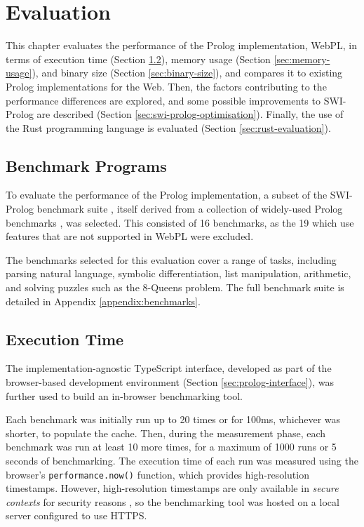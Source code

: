 \chapter{Evaluation}

This chapter evaluates the performance of the Prolog implementation, WebPL, in terms of execution time (Section \ref{sec:execution-time}), memory usage (Section \ref{sec:memory-usage}), and binary size (Section \ref{sec:binary-size}), and compares it to existing Prolog implementations for the Web. Then, the factors contributing to the performance differences are explored, and some possible improvements to SWI-Prolog are described (Section \ref{sec:swi-prolog-optimisation}). Finally, the use of the Rust programming language is evaluated (Section \ref{sec:rust-evaluation}).

\section{Benchmark Programs}

To evaluate the performance of the Prolog implementation, a subset of the SWI-Prolog benchmark suite \cite{wielemakerSWIPrologbenchmarksuite2010}, itself derived from a collection of widely-used Prolog benchmarks \cite{haygoodPrologBenchmarkSuite1989}, was selected. This consisted of 16 benchmarks, as the 19 which use features that are not supported in WebPL were excluded.

The benchmarks selected for this evaluation cover a range of tasks, including parsing natural language, symbolic differentiation, list manipulation, arithmetic, and solving puzzles such as the 8-Queens problem. The full benchmark suite is detailed in Appendix \ref{appendix:benchmarks}.

\section{Execution Time}

\label{sec:execution-time}

The implementation-agnostic TypeScript interface, developed as part of the browser-based development environment (Section \ref{sec:prolog-interface}), was further used to build an in-browser benchmarking tool.

Each benchmark was initially run up to 20 times or for 100ms, whichever was shorter, to populate the cache. Then, during the measurement phase, each benchmark was run at least 10 more times, for a maximum of 1000 runs or 5 seconds of benchmarking. The execution time of each run was measured using the browser's \texttt{performance.now()} function, which provides high-resolution timestamps. However, high-resolution timestamps are only available in \emph{secure contexts} for security reasons \cite{sanchez-rolaClockClockTimeBased2018}, so the benchmarking tool was hosted on a local server configured to use HTTPS.

